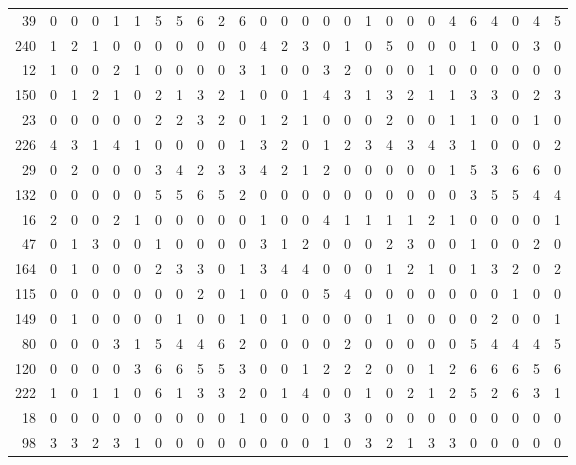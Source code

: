 \begin{longtable}{@{\extracolsep{\fill}}rccccccccccccccccccccccccc@{}}
39 & 0 & 0 & 0 & 1 & 1 & 5 & 5 & 6 & 2 & 6 & 0 & 0 & 0 & 0 & 0 & 1 & 0 & 0 & 0 & 4 & 6 & 4 & 0 & 4 & 5 \\
240 & 1 & 2 & 1 & 0 & 0 & 0 & 0 & 0 & 0 & 0 & 4 & 2 & 3 & 0 & 1 & 0 & 5 & 0 & 0 & 0 & 1 & 0 & 0 & 3 & 0 \\
12 & 1 & 0 & 0 & 2 & 1 & 0 & 0 & 0 & 0 & 3 & 1 & 0 & 0 & 3 & 2 & 0 & 0 & 0 & 1 & 0 & 0 & 0 & 0 & 0 & 0 \\
150 & 0 & 1 & 2 & 1 & 0 & 2 & 1 & 3 & 2 & 1 & 0 & 0 & 1 & 4 & 3 & 1 & 3 & 2 & 1 & 1 & 3 & 3 & 0 & 2 & 3 \\
23 & 0 & 0 & 0 & 0 & 0 & 2 & 2 & 3 & 2 & 0 & 1 & 2 & 1 & 0 & 0 & 0 & 2 & 0 & 0 & 1 & 1 & 0 & 0 & 1 & 0 \\
226 & 4 & 3 & 1 & 4 & 1 & 0 & 0 & 0 & 0 & 1 & 3 & 2 & 0 & 1 & 2 & 3 & 4 & 3 & 4 & 3 & 1 & 0 & 0 & 0 & 2 \\
29 & 0 & 2 & 0 & 0 & 0 & 3 & 4 & 2 & 3 & 3 & 4 & 2 & 1 & 2 & 0 & 0 & 0 & 0 & 0 & 1 & 5 & 3 & 6 & 6 & 0 \\
132 & 0 & 0 & 0 & 0 & 0 & 5 & 5 & 6 & 5 & 2 & 0 & 0 & 0 & 0 & 0 & 0 & 0 & 0 & 0 & 0 & 3 & 5 & 5 & 4 & 4 \\
16 & 2 & 0 & 0 & 2 & 1 & 0 & 0 & 0 & 0 & 0 & 1 & 0 & 0 & 4 & 1 & 1 & 1 & 1 & 2 & 1 & 0 & 0 & 0 & 0 & 1 \\
47 & 0 & 1 & 3 & 0 & 0 & 1 & 0 & 0 & 0 & 0 & 3 & 1 & 2 & 0 & 0 & 0 & 2 & 3 & 0 & 0 & 1 & 0 & 0 & 2 & 0 \\
164 & 0 & 1 & 0 & 0 & 0 & 2 & 3 & 3 & 0 & 1 & 3 & 4 & 4 & 0 & 0 & 0 & 1 & 2 & 1 & 0 & 1 & 3 & 2 & 0 & 2 \\
115 & 0 & 0 & 0 & 0 & 0 & 0 & 0 & 2 & 0 & 1 & 0 & 0 & 0 & 5 & 4 & 0 & 0 & 0 & 0 & 0 & 0 & 0 & 1 & 0 & 0 \\
149 & 0 & 1 & 0 & 0 & 0 & 0 & 1 & 0 & 0 & 1 & 0 & 1 & 0 & 0 & 0 & 0 & 1 & 0 & 0 & 0 & 0 & 2 & 0 & 0 & 1 \\
80 & 0 & 0 & 0 & 3 & 1 & 5 & 4 & 4 & 6 & 2 & 0 & 0 & 0 & 0 & 2 & 0 & 0 & 0 & 0 & 0 & 5 & 4 & 4 & 4 & 5 \\
120 & 0 & 0 & 0 & 0 & 3 & 6 & 6 & 5 & 5 & 3 & 0 & 0 & 1 & 2 & 2 & 2 & 0 & 0 & 1 & 2 & 6 & 6 & 6 & 5 & 6 \\
222 & 1 & 0 & 1 & 1 & 0 & 6 & 1 & 3 & 3 & 2 & 0 & 1 & 4 & 0 & 0 & 1 & 0 & 2 & 1 & 2 & 5 & 2 & 6 & 3 & 1 \\
18 & 0 & 0 & 0 & 0 & 0 & 0 & 0 & 0 & 0 & 1 & 0 & 0 & 0 & 0 & 3 & 0 & 0 & 0 & 0 & 0 & 0 & 0 & 0 & 0 & 0 \\
98 & 3 & 3 & 2 & 3 & 1 & 0 & 0 & 0 & 0 & 0 & 0 & 0 & 0 & 1 & 0 & 3 & 2 & 1 & 3 & 3 & 0 & 0 & 0 & 0 & 0 \\

\end{longtable}
